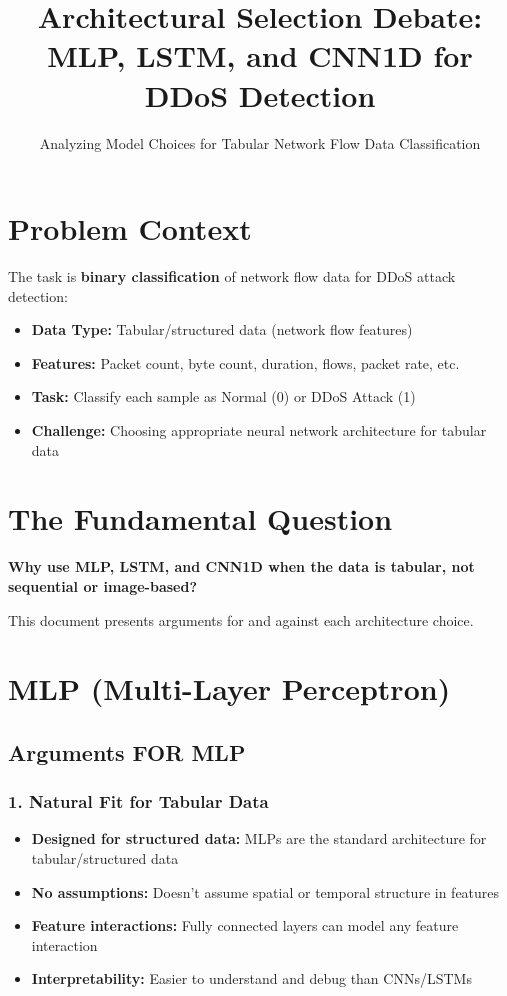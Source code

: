 \documentclass[12pt]{article}
\title{Architectural Selection Debate: MLP, LSTM, and CNN1D for DDoS Detection}
\subtitle{Analyzing Model Choices for Tabular Network Flow Data Classification}
\author{}
\date{}
\begin{document}
\maketitle

\section{Problem Context}

The task is \textbf{binary classification} of network flow data for DDoS attack detection:
\begin{itemize}
    \item \textbf{Data Type:} Tabular/structured data (network flow features)
    \item \textbf{Features:} Packet count, byte count, duration, flows, packet rate, etc.
    \item \textbf{Task:} Classify each sample as Normal (0) or DDoS Attack (1)
    \item \textbf{Challenge:} Choosing appropriate neural network architecture for tabular data
\end{itemize}

\section{The Fundamental Question}

\textbf{Why use MLP, LSTM, and CNN1D when the data is tabular, not sequential or image-based?}

This document presents arguments for and against each architecture choice.

\section{MLP (Multi-Layer Perceptron)}

\subsection{Arguments FOR MLP}

\subsubsection{1. Natural Fit for Tabular Data}
\begin{itemize}
    \item \textbf{Designed for structured data:} MLPs are the standard architecture for tabular/structured data
    \item \textbf{No assumptions:} Doesn't assume spatial or temporal structure in features
    \item \textbf{Feature interactions:} Fully connected layers can model any feature interaction
    \item \textbf{Interpretability:} Easier to understand and debug than CNNs/LSTMs
\end{itemize}
\end{document}
